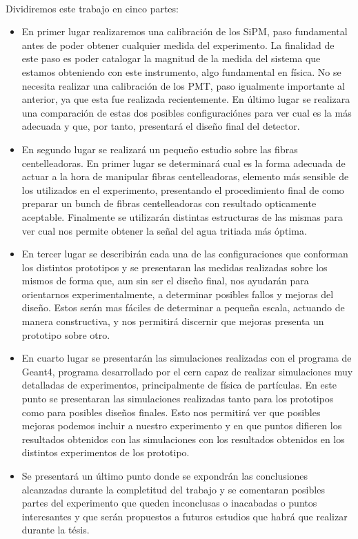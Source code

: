 \documentclass[11pt, a4paper]{article}
\begin{document}
\paragraph {}
Dividiremos este trabajo en cinco partes:
\begin{itemize}
\item{} En primer lugar realizaremos una calibración de los SiPM, paso fundamental antes de poder obtener cualquier medida del experimento. La finalidad de este paso es poder catalogar la magnitud de la medida del sistema que estamos obteniendo con este instrumento, algo fundamental en física. No se necesita realizar una calibración de los PMT, paso igualmente importante al anterior, ya que esta fue realizada recientemente. 
\newline
En último lugar se realizara una comparación de estas dos posibles configuraciónes para ver cual es la más adecuada y que, por tanto, presentará el diseño final del detector.

\item{} En segundo lugar se realizará un pequeño estudio sobre las fibras centelleadoras. En primer lugar se determinará cual es la forma adecuada de actuar a la hora de manipular fibras centelleadoras, elemento más sensible de los utilizados en el experimento, presentando el procedimiento final de como preparar un bunch de fibras centelleadoras con resultado opticamente aceptable. Finalmente se utilizarán distintas estructuras de las mismas para ver cual nos permite obtener la señal del agua tritiada  más óptima. 

\item{} En tercer lugar se describirán cada una de las configuraciones que conforman los distintos prototipos y se presentaran las medidas realizadas sobre los mismos de forma que, aun sin ser el diseño final, nos ayudarán para orientarnos experimentalmente, a determinar posibles fallos y mejoras del diseño. Estos serán mas fáciles de determinar a pequeña escala, actuando de manera constructiva, y nos permitirá discernir que mejoras presenta un prototipo sobre otro. 

\item{} En cuarto lugar se presentarán las simulaciones realizadas con el programa de Geant4, programa desarrollado por el cern capaz de realizar simulaciones muy detalladas de experimentos, principalmente de física de partículas. En este punto se presentaran las simulaciones realizadas tanto para los prototipos como para posibles diseños finales. Esto nos permitirá ver que posibles mejoras podemos incluir a nuestro experimento y en que puntos difieren los resultados obtenidos con las simulaciones con los resultados obtenidos en los distintos experimentos de los prototipo.

\item{} Se presentará un último punto donde se expondrán las conclusiones alcanzadas durante la completitud del trabajo y se comentaran posibles partes del experimento que queden inconclusas o inacabadas o puntos interesantes y que serán propuestos a futuros estudios que habrá que realizar durante la tésis.
\end{itemize}
\end{document}
